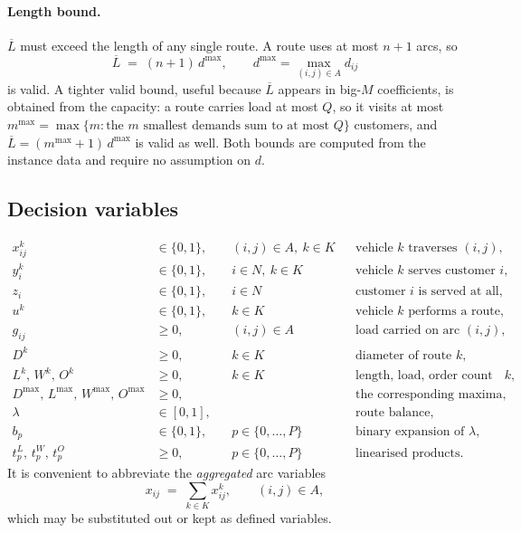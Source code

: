 \documentclass[11pt,a4paper]{article}
\theoremstyle{definition}
\theoremstyle{plain}
\newcommand{\Arcs}{A}
\newcommand{\Cust}{N}
\newcommand{\Veh}{K}
\newcommand{\Lmax}{L^{\max}}
\newcommand{\Wmax}{W^{\max}}
\newcommand{\Omax}{O^{\max}}
\newcommand{\Dmax}{D^{\max}}
\newcommand{\Lub}{\overline{L}}
\begin{document}
\paragraph{Length bound.}
$\Lub$ must exceed the length of any single route.  A route uses at most $n+1$
arcs, so
\begin{equation}
  \Lub \;=\; (n+1)\, d^{\max}, \qquad
  d^{\max} = \max_{(i,j) \in \Arcs} d_{ij}
  \label{eq:Lub}
\end{equation}
is valid.  A tighter valid bound, useful because $\Lub$ appears in big-$M$
coefficients, is obtained from the capacity: a route carries load at most $Q$,
so it visits at most $m^{\max} = \max\{ m : \text{the } m \text{ smallest
demands sum to at most } Q \}$ customers, and
$\Lub = (m^{\max}+1)\,d^{\max}$ is valid as well.  Both bounds are computed
from the instance data and require no assumption on $d$.

\subsection{Decision variables}
\label{sec:milp-vars}

\begin{align}
  x^k_{ij} &\in \{0,1\}, & &(i,j) \in \Arcs,\ k \in \Veh
  && \text{vehicle } k \text{ traverses } (i,j), \\
  y^k_i    &\in \{0,1\}, & &i \in \Cust,\ k \in \Veh
  && \text{vehicle } k \text{ serves customer } i, \\
  z_i      &\in \{0,1\}, & &i \in \Cust
  && \text{customer } i \text{ is served at all}, \\
  u^k      &\in \{0,1\}, & &k \in \Veh
  && \text{vehicle } k \text{ performs a route}, \\
  g_{ij}   &\ge 0,       & &(i,j) \in \Arcs
  && \text{load carried on arc } (i,j), \\
  D^k      &\ge 0,       & &k \in \Veh
  && \text{diameter of route } k, \\
  L^k,\, W^k,\, O^k &\ge 0, & &k \in \Veh
  && \text{length, load, order count of route } k, \\
  \Dmax,\, \Lmax,\, \Wmax,\, \Omax &\ge 0, & &
  && \text{the corresponding maxima}, \\
  \lambda  &\in [0,1],   & &
  && \text{route balance}, \\
  b_p      &\in \{0,1\}, & &p \in \{0,\dots,P\}
  && \text{binary expansion of } \lambda, \\
  t^{L}_p,\, t^{W}_p,\, t^{O}_p &\ge 0, & &p \in \{0,\dots,P\}
  && \text{linearised products.}
\end{align}
It is convenient to abbreviate the \emph{aggregated} arc variables
\begin{equation}
  x_{ij} \;=\; \sum_{k \in \Veh} x^k_{ij}, \qquad (i,j) \in \Arcs,
  \label{eq:aggregate}
\end{equation}
which may be substituted out or kept as defined variables.
\end{document}

